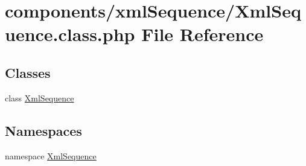 \hypertarget{_xml_sequence_8class_8php}{
\section{components/xmlSequence/XmlSequence.class.php File Reference}
\label{_xml_sequence_8class_8php}
}
\subsection*{Classes}
\begin{CompactItemize}
\item 
class \hyperlink{class_xml_sequence}{XmlSequence}
\end{CompactItemize}
\subsection*{Namespaces}
\begin{CompactItemize}
\item 
namespace \hyperlink{namespace_xml_sequence}{XmlSequence}
\end{CompactItemize}
